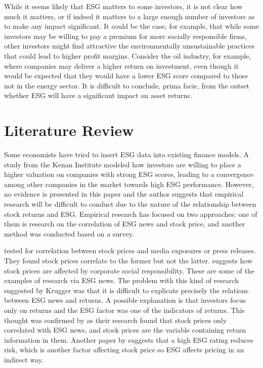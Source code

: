 \documentclass[man,natbib,floatsintext]{apa6}
\begin{document}
While it seems likely that ESG matters to some investors, it is not clear how much it matters, or if indeed it matters to a large enough number of investors as to make any impact significant. It could be the case, for example, that while some investors may be willing to pay a premium for more socially responsible firms, other investors might find attractive the environmentally unsustainable practices that could lead to higher profit margins. Consider the oil industry, for example, where companies may deliver a higher return on investment, even though it would be expected that they would have a lower ESG score compared to those not in the energy sector. It is difficult to conclude, prima facie, from the outset whether ESG will have a significant impact on asset returns.



\section{\textbf{Literature Review}}
Some economists have tried to insert ESG data into existing finance models. A study from the Kenan Institute modeled how investors are willing to place a higher valuation on companies with strong ESG scores, leading to a convergence among other companies in the market towards high ESG performance. However, no evidence is presented in this paper and the author suggests that empirical research will be difficult to conduct due to the nature of the relationship between stock returns and ESG. Empirical research has focused on two approaches: one of them is research on the correlation of ESG news and stock price, and another method was conducted based on a survey.
  
\citet{capelle-blancard_petit_2017} tested for correlation between stock prices and media exposures or press releases. They found stock prices correlate to the former but not the latter. \citep{philip} suggests how stock prices are affected by corporate social responsibility. These are some of the examples of research via ESG news. The problem with this kind of research suggested by Krugger was that it is difficult to explicate precisely the relations between ESG news and returns. A possible explanation is that investors focus only on returns and the ESG factor was one of the indicators of returns. This thought was confirmed by \citep{aaron_yoon} as their research found that stock prices only correlated with ESG news, and stock prices are the variable containing return information in them. Another paper by \citep{ashwin} suggests that a high ESG rating reduces risk, which is another factor affecting stock price so ESG affects pricing in an indirect way.
  
\end{document}
